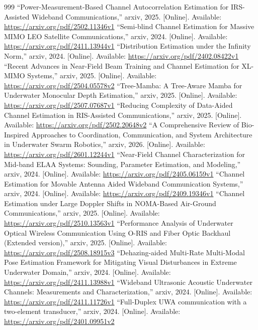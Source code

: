 \documentclass[10pt,journal]{IEEEtran}
\begin{document}
\begin{thebibliography}{999}
 ``Power-Measurement-Based Channel Autocorrelation Estimation for IRS-Assisted Wideband Communications,'' arxiv, 2025. [Online]. Available: \url{https://arxiv.org/pdf/2502.11346v1}
 ``Semi-blind Channel Estimation for Massive MIMO LEO Satellite Communications,'' arxiv, 2024. [Online]. Available: \url{https://arxiv.org/pdf/2411.13944v1}
 ``Distribution Estimation under the Infinity Norm,'' arxiv, 2024. [Online]. Available: \url{https://arxiv.org/pdf/2402.08422v1}
 ``Recent Advances in Near-Field Beam Training and Channel Estimation for XL-MIMO Systems,'' arxiv, 2025. [Online]. Available: \url{https://arxiv.org/pdf/2504.05578v2}
 ``Tree-Mamba: A Tree-Aware Mamba for Underwater Monocular Depth Estimation,'' arxiv, 2025. [Online]. Available: \url{https://arxiv.org/pdf/2507.07687v1}
 ``Reducing Complexity of Data-Aided Channel Estimation in RIS-Assisted Communications,'' arxiv, 2025. [Online]. Available: \url{https://arxiv.org/pdf/2502.20648v2}
 ``A Comprehensive Review of Bio-Inspired Approaches to Coordination, Communication, and System Architecture in Underwater Swarm Robotics,'' arxiv, 2026. [Online]. Available: \url{https://arxiv.org/pdf/2601.12244v1}
 ``Near-Field Channel Characterization for Mid-band ELAA Systems: Sounding, Parameter Estimation, and Modeling,'' arxiv, 2024. [Online]. Available: \url{https://arxiv.org/pdf/2405.06159v1}
 ``Channel Estimation for Movable Antenna Aided Wideband Communication Systems,'' arxiv, 2024. [Online]. Available: \url{https://arxiv.org/pdf/2409.19346v1}
 ``Channel Estimation under Large Doppler Shifts in NOMA-Based Air-Ground Communications,'' arxiv, 2025. [Online]. Available: \url{https://arxiv.org/pdf/2510.13563v1}
 ``Performance Analysis of Underwater Optical Wireless Communication Using O-RIS and Fiber Optic Backhaul (Extended version),'' arxiv, 2025. [Online]. Available: \url{https://arxiv.org/pdf/2508.18915v3}
 ``Dehazing-aided Multi-Rate Multi-Modal Pose Estimation Framework for Mitigating Visual Disturbances in Extreme Underwater Domain,'' arxiv, 2024. [Online]. Available: \url{https://arxiv.org/pdf/2411.13988v1}
 ``Wideband Ultrasonic Acoustic Underwater Channels: Measurements and Characterization,'' arxiv, 2024. [Online]. Available: \url{https://arxiv.org/pdf/2411.11726v1}
 ``Full-Duplex UWA communication with a two-element transducer,'' arxiv, 2024. [Online]. Available: \url{https://arxiv.org/pdf/2401.09951v2}

\end{thebibliography}
\end{document}
